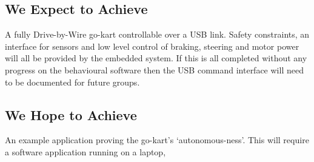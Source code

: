\subsection{We Expect to Achieve}
A fully Drive-by-Wire go-kart controllable over a USB link. Safety constraints, an interface for sensors and low level control of braking, steering and motor power will all be provided by the embedded system. If this is all completed without any progress on the behavioural software then the USB command interface will need to be documented for future groups.

\subsection{We Hope to Achieve}
An example application proving the go-kart's `autonomous-ness'. This will require a software application running on a laptop,
